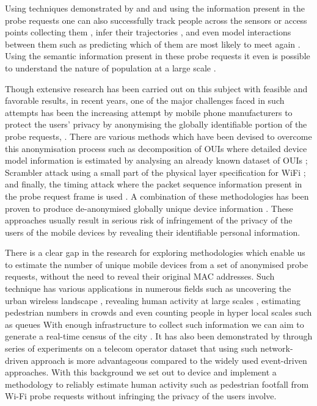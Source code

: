 Using techniques demonstrated by \cite{franklin2006passive} and \cite{pang2007802} and using the information present in the probe requests one can also successfully track people across the sensors or access points collecting them \citep{cunche2014linking}, infer their trajectories \citep{musa2012tracking}, and even model interactions between them \citep{cheng2012inferring,barbera2013signals,cunche2014know} such as predicting which of them are most likely to meet again \citep{cunche2012know}.
Using the semantic information present in these probe requests it even is possible to understand the nature of population at a large scale \citep{di2016mind}. 

Though extensive research has been carried out on this subject with feasible and favorable results, in recent years, one of the major challenges faced in such attempts has been the increasing attempt by mobile phone manufacturers to protect the users’ privacy by anonymising the globally identifiable portion of the probe requests, \citep{green2008}.
There are various methods which have been devised to overcome this anonymisation process such as decomposition of OUIs where detailed device model information is estimated by analysing an already known dataset of OUIs \citep{martin2016decomposition}; Scrambler attack using a small part of the physical layer specification for WiFi \citep{vo2016,bloessl2015scrambler}; and finally, the timing attack where the packet sequence information present in the probe request frame is used \citep{matte2016,cheng2016can}.
A combination of these methodologies has been proven to produce de-anonymised globally unique device information \citep{vanhoef2016, martin2017}. These approaches usually result in serious risk of infringement of the privacy of the users of the mobile devices by revealing their identifiable personal information.

There is a clear gap in the research for exploring methodologies which enable us to estimate the number of unique mobile devices from a set of anonymised probe requests, without the need to reveal their original MAC addresses.
Such technique has various applications in numerous fields such as uncovering the urban wireless landscape \citep{rose2010mapping}, revealing human activity at large scales \citep{qin2013discovering}, estimating pedestrian numbers in crowds \citep{schauer2014estimating,fukuzaki2015statistical} and even counting people in hyper local scales such as queues \citep{wang2013measuring}
With enough infrastructure to collect such information we can aim to generate a real-time census of the city \citep{konto2017}.
It has also been demonstrated by \citep{pinelli2015comparing} through series of experiments on a telecom operator dataset that using such network-driven approach is more advantageous compared to the widely used event-driven approaches. With this background we set out to device and implement a methodology to reliably estimate human activity such as pedestrian footfall from Wi-Fi probe requests without infringing the privacy of the users involve.
